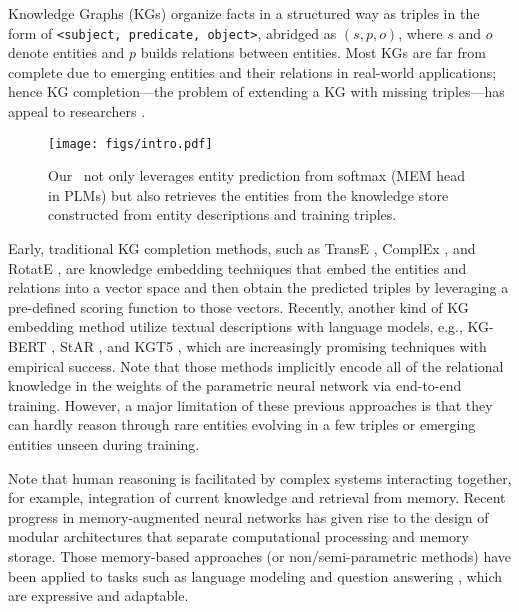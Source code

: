 \documentclass[runningheads]{llncs}
\begin{document}
Knowledge Graphs (KGs) organize facts in a structured way as triples in the form of \texttt{<subject, predicate, object>}, abridged as $(s, p, o)$, where $s$ and $o$ denote entities and $p$ builds relations between entities. 
Most KGs are far from complete due to emerging entities and their relations in real-world applications; hence KG completion—the problem of extending a KG with missing triples—has appeal to researchers \cite{transR,DBLP:conf/www/ZhangDSCZC20,DBLP:conf/ijcai/QiZCCXZZ21,DBLP:conf/kdd/ZhangJD0YCTHWHC21,DBLP:conf/ijcai/Chen0YCDHC22,DBLP:conf/sigir/Chen0ZZYXC22,张宁豫2022knowledge,Chen_2022}.

\begin{figure}[htbp]
    \centering
    \texttt{[image: figs/intro.pdf]}
    \caption{Our \ours~not only leverages entity prediction from softmax (MEM head in PLMs) but also retrieves the entities from the knowledge store constructed from entity descriptions and training triples.}
    \label{fig:intro}
\end{figure}
Early, traditional KG completion methods, such as TransE \cite{Bordes:TransE}, ComplEx \cite{complex}, and RotatE \cite{RotatE}, are knowledge embedding techniques that embed the entities and relations into a vector space and then obtain the predicted triples by leveraging a pre-defined scoring function to those vectors. 
Recently, another kind of KG embedding method utilize textual descriptions with language models, e.g., KG-BERT \cite{kgbert}, StAR \cite{STAR}, and KGT5 \cite{kgt5}, which are increasingly promising techniques with empirical success.
Note that those methods implicitly encode all of the relational knowledge in the weights of the parametric neural network via end-to-end training.
However, a major limitation of these previous approaches is that they can hardly reason through rare entities evolving in a few triples or emerging entities unseen during training. 
 
Note that human reasoning is facilitated by complex systems interacting together, for example, integration of current knowledge and retrieval from memory. 
Recent progress in memory-augmented neural networks has given rise to the design of modular architectures that separate computational processing and memory storage. 
Those memory-based approaches (or non/semi-parametric methods) have been applied to tasks such as language modeling \cite{DBLP:conf/iclr/KhandelwalLJZL20} and question answering \cite{DBLP:conf/emnlp/KassnerS20}, which are expressive and adaptable. 
\end{document}
